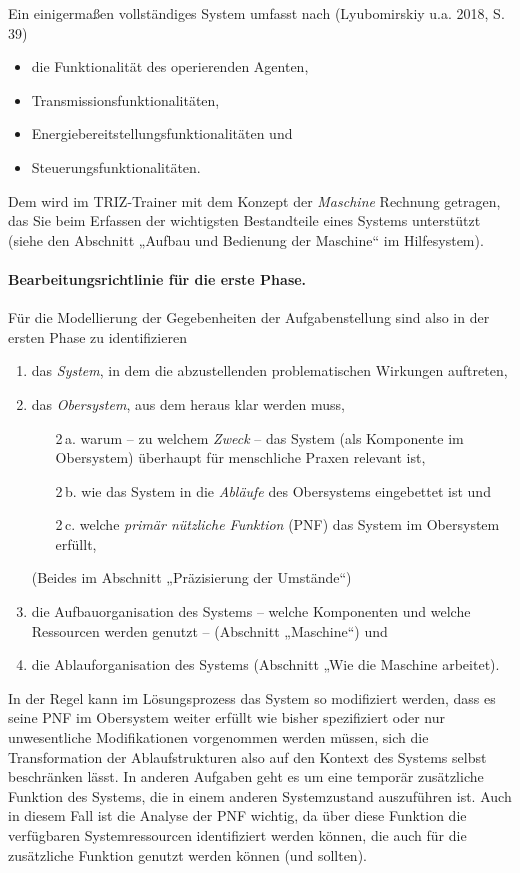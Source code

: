 \documentclass[11pt,a4paper]{article}
\begin{document}
Ein einigermaßen vollständiges System umfasst nach (Lyubomirskiy u.a. 2018,
S. 39)
\begin{itemize}[noitemsep]
\item die Funktionalität des operierenden Agenten,
\item Transmissionsfunktionalitäten,
\item Energiebereitstellungsfunktionalitäten und
\item Steuerungsfunktionalitäten.
\end{itemize}
Dem wird im TRIZ-Trainer mit dem Konzept der \emph{Maschine} Rechnung
getragen, das Sie beim Erfassen der wichtigsten Bestandteile eines Systems
unterstützt (siehe den Abschnitt „Aufbau und Bedienung der Maschine“ im
Hilfesystem).

\paragraph{Bearbeitungsrichtlinie für die erste Phase.}
Für die Modellierung der Gegebenheiten der Aufgabenstellung sind also in der
ersten Phase zu identifizieren 
\begin{enumerate}\itemsep0pt
\item das \emph{System}, in dem die abzustellenden problematischen Wirkungen
  auftreten,
\item das \emph{Obersystem}, aus dem heraus klar werden muss,
\begin{enumerate}\itemsep0pt
\item [2\,a.] warum -- zu welchem \emph{Zweck} -- das System (als Komponente
  im Obersystem) überhaupt für menschliche Praxen relevant ist,
\item [2\,b.] wie das System in die \emph{Abläufe} des Obersystems eingebettet
  ist und
\item [2\,c.] welche \emph{primär nützliche Funktion} (PNF) das System im
  Obersystem erfüllt,
\end{enumerate}
(Beides im Abschnitt „Präzisierung der Umstände“)
\item die Aufbauorganisation des Systems -- welche Komponenten und welche
  Ressourcen werden genutzt -- (Abschnitt „Maschine“) und
\item die Ablauforganisation des Systems (Abschnitt „Wie die Maschine
  arbeitet).
\end{enumerate}
In der Regel kann im Lösungsprozess das System so modifiziert werden, dass es
seine PNF im Obersystem weiter erfüllt wie bisher spezifiziert oder nur
unwesentliche Modifikationen vorgenommen werden müssen, sich die
Transformation der Ablaufstrukturen also auf den Kontext des Systems selbst
beschränken lässt.  In anderen Aufgaben geht es um eine temporär zusätzliche
Funktion des Systems, die in einem anderen Systemzustand auszuführen ist. Auch
in diesem Fall ist die Analyse der PNF wichtig, da über diese Funktion die
verfügbaren Systemressourcen identifiziert werden können, die auch für die
zusätzliche Funktion genutzt werden können (und sollten).
\end{document}
